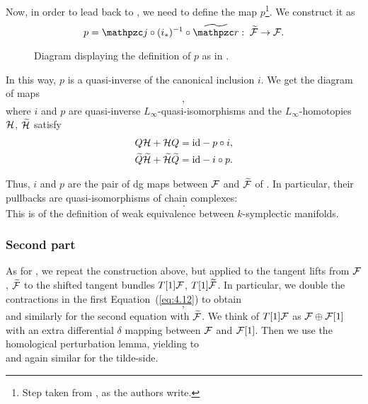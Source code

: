 Now, in order to lead back to , we need to define the map $p$\footnote{Step taken from \cite[Section 10.4.6]{Algebraic_operands_key_step}, as the authors write.}.
We construct it as
\begin{equation}
\label{eq:def_p}
    p = \cazz{j} \circ (i_*)^{-1} \circ \wt{\cazz{r}}:
    \; \wt{\F} \rightarrow \F .
\end{equation}
\begin{figure}
    \centering
    
    \caption{Diagram displaying the definition of $p$ as in .}
    \label{fig:comm_diagram_def_p}
\end{figure}
In this way, $p$ is a quasi-inverse of the canonical inclusion $i$.
We get the diagram of maps
\begin{equation}
    ,
\end{equation}
where $i$ and $p$ are quasi-inverse $L_\infty$-quasi-isomorphisms and the $L_\infty$-homotopies $\mathcal{H}$, $\widetilde{\mathcal{H}}$ satisfy
\begin{equation}
\label{eq:L_infty_homotopies}
    \begin{aligned}
        Q \mathcal{H} + \mathcal{H} Q =&
        \; \text{id} - p \circ i , \\
        \widetilde{Q} \widetilde{\mathcal{H}} + \widetilde{\mathcal{H}} \widetilde{Q} =&
        \; \text{id} - i \circ p .
    \end{aligned}
\end{equation}

Thus, $i$ and $p$ are the pair of dg maps between $\mathcal{F}$ and $\widetilde{\mathcal{F}}$ of .
In particular, their pullbacks are quasi-isomorphisms of chain complexes:
\begin{equation}
     .
\end{equation}
This is  of the definition of weak equivalence between $k$-symplectic manifolds.

\subsubsection{Second part}
\label{subsubsec:second_part}

As for , we repeat the construction above, but applied to the tangent lifts from $\mathcal{F}$, $\widetilde{\mathcal{F}}$ to the shifted tangent bundles $T[1]\mathcal{F}$, $T[1]\widetilde{\mathcal{F}}$.
In particular, we double the contractions in the first Equation~(\ref{eq:4.12}) to obtain
\begin{equation}
    ,
\end{equation}
and similarly for the second equation with $\widetilde{\mathcal{F}}$.
We think of $T[1]\mathcal{F}$ as $\mathcal{F} \oplus \mathcal{F}[1]$ with an extra differential $\delta$ mapping between $\mathcal{F}$ and $\mathcal{F}[1]$.
Then we use the homological perturbation lemma, yielding to
\begin{equation}
    
\end{equation}
and again similar for the tilde-side.

